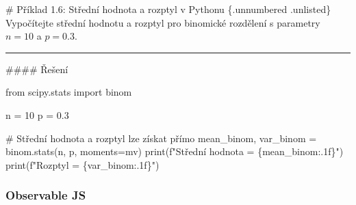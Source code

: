 \documentclass[
  czech,
  11pt,
  letterpaper,
  DIV=11,
  numbers=noendperiod]{scrreprt}
\newenvironment{Shaded}{\begin{snugshade}}{\end{snugshade}}
\newcommand{\BuiltInTok}[1]{\textcolor[rgb]{0.00,0.23,0.31}{#1}}
\newcommand{\CommentTok}[1]{\textcolor[rgb]{0.37,0.37,0.37}{#1}}
\newcommand{\DecValTok}[1]{\textcolor[rgb]{0.68,0.00,0.00}{#1}}
\newcommand{\FloatTok}[1]{\textcolor[rgb]{0.68,0.00,0.00}{#1}}
\newcommand{\ImportTok}[1]{\textcolor[rgb]{0.00,0.46,0.62}{#1}}
\newcommand{\NormalTok}[1]{\textcolor[rgb]{0.00,0.23,0.31}{#1}}
\newcommand{\OperatorTok}[1]{\textcolor[rgb]{0.37,0.37,0.37}{#1}}
\newcommand{\SpecialCharTok}[1]{\textcolor[rgb]{0.37,0.37,0.37}{#1}}
\newcommand{\SpecialStringTok}[1]{\textcolor[rgb]{0.13,0.47,0.30}{#1}}
\newcommand{\StringTok}[1]{\textcolor[rgb]{0.13,0.47,0.30}{#1}}
\begin{document}
\begin{tcolorbox}[enhanced jigsaw, arc=.35mm, bottomrule=.15mm, bottomtitle=1mm, breakable, colback=white, colbacktitle=quarto-callout-note-color!10!white, colframe=quarto-callout-note-color-frame, coltitle=black, left=2mm, leftrule=.75mm, opacityback=0, opacitybacktitle=0.6, rightrule=.15mm, title=\textcolor{quarto-callout-note-color}{\faInfo}\hspace{0.5em}{Poznámka}, titlerule=0mm, toprule=.15mm, toptitle=1mm]

\# Příklad 1.6: Střední hodnota a rozptyl v Pythonu \{.unnumbered
.unlisted\} Vypočítejte střední hodnotu a rozptyl pro binomické
rozdělení s parametry \(n=10\) a \(p=0.3\).

\begin{center}\rule{0.5\linewidth}{0.5pt}\end{center}

\#\#\#\# Řešení

\begin{Shaded}
\begin{Highlighting}[]
\ImportTok{from}\NormalTok{ scipy.stats }\ImportTok{import}\NormalTok{ binom}

\NormalTok{n }\OperatorTok{=} \DecValTok{10}
\NormalTok{p }\OperatorTok{=} \FloatTok{0.3}

\CommentTok{\# Střední hodnota a rozptyl lze získat přímo}
\NormalTok{mean\_binom, var\_binom }\OperatorTok{=}\NormalTok{ binom.stats(n, p, moments}\OperatorTok{=}\StringTok{\textquotesingle{}mv\textquotesingle{}}\NormalTok{)}
\BuiltInTok{print}\NormalTok{(}\SpecialStringTok{f"Střední hodnota = }\SpecialCharTok{\{}\NormalTok{mean\_binom}\SpecialCharTok{:.1f\}}\SpecialStringTok{"}\NormalTok{)}
\BuiltInTok{print}\NormalTok{(}\SpecialStringTok{f"Rozptyl = }\SpecialCharTok{\{}\NormalTok{var\_binom}\SpecialCharTok{:.1f\}}\SpecialStringTok{"}\NormalTok{)}
\end{Highlighting}
\end{Shaded}

\end{tcolorbox}

\subsubsection*{Observable JS}\label{observable-js}
\end{document}
